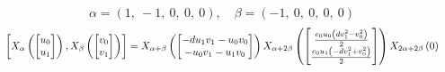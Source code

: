 \documentclass[11pt]{article}
\theoremstyle{definition}
\begin{document}
\[
\alpha = \left( 1, \  -1, \  0, \  0, \  0\right), \quad \beta = \left( -1, \  0, \  0, \  0, \  0\right)
\]
\[
\scaletoalign{\textwidth}{\left[ X_{\alpha}\left(\left[\begin{matrix}u_{0}\\u_{1}\end{matrix}\right]\right), X_{\beta}\left(\left[\begin{matrix}v_{0}\\v_{1}\end{matrix}\right]\right) \right] = X_{\alpha + \beta}\left(\left[\begin{matrix}- d u_{1} v_{1} - u_{0} v_{0}\\- u_{0} v_{1} - u_{1} v_{0}\end{matrix}\right]\right) X_{\alpha + 2\beta}\left(\left[\begin{matrix}\frac{c_{0} u_{0} \left(d v_{1}^{2} - v_{0}^{2}\right)}{2}\\\frac{c_{0} u_{1} \left(- d v_{1}^{2} + v_{0}^{2}\right)}{2}\end{matrix}\right]\right) X_{2\alpha + 2\beta}\left(0\right)}
\]
\end{document}
